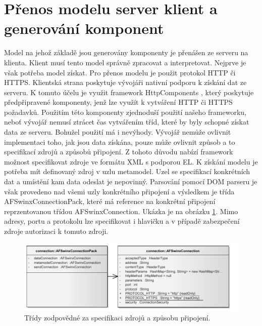 \section{Přenos modelu server klient a generování komponent}
Model na jehož základě jsou generovány komponenty je přenášen ze serveru na klienta. Klient musí tento model správně zpracovat a interpretovat. Nejprve je však potřeba model získat. Pro přenos modelu je použit protokol HTTP či HTTPS. Klientská strana poskytuje vývojáři nativní podporu k získání dat ze serveru. K tomuto účelu je využit framework HttpComponents \cite{apacheHttp}, který poskytuje předpřipravené komponenty, jenž lze využít k vytváření HTTP či HTTPS požadavků. Použitím této komponenty zjednoduší použití našeho frameworku, neboť vývojář nemusí ztrácet čas vytvářením tříd, které by byly schopné získat data ze serveru. Bohužel použití má i nevýhody. Vývojář nemůže ovlivnit implementaci toho, jak jsou data získána, pouze může ovlivnit způsob a to specifikací zdrojů a způsobů připojení. Z tohoto důvodu nabízí framework možnost specifikovat zdroje ve formátu XML s podporou EL. K získání modelu je potřeba mít definovaný zdroj v uzlu metamodel. Uzel se specifikací konkrétních dat a umístění kam data odeslat je nepovinný. Parsování pomocí DOM parseru je však provedeno nad všemi uzly konkrétního připojení a výsledkem je třída AFSwinxConnectionPack, které má reference na konkrétní připojení reprzentovanou třídou AFSwinxConnection. Ukázka je na obrázku \ref{img:connectionPack}. 	Mimo adresy, portu a protokolu lze specifikovat i hlavičku a v případě zabezpečení zdroje autorizaci k tomuto zdroji.

\begin{figure}[h!]
\includegraphics{images/connectionPack}
\caption{Třídy zodpovědné za specifikaci zdrojů a způsobu připojení.}
\label{img:connectionPack}
\end{figure}

